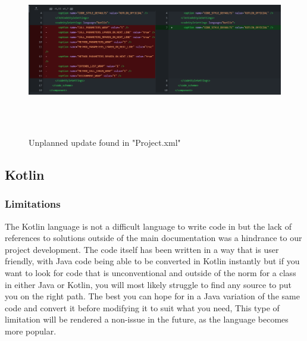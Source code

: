 \begin{figure}[H]
    \centering
    \includegraphics[width=16cm, height = 7.5cm]{img/Unplannedupdate.png}
    \caption{Unplanned update found in "Project.xml"}
    \label{fig:altas config}
\end{figure}

\subsection{Kotlin}
\subsubsection{Limitations}
The Kotlin language is not a difficult language to write code in but the lack of references to solutions outside of the main documentation was a hindrance to our project development. 
\newline
\newline 
The code itself has been written in a way that is user friendly, with Java code being able to be converted in Kotlin instantly but if you want to look for code that is unconventional and outside of the norm for a class in either Java or Kotlin, you will most likely struggle to find any source to put you on the right path. 
\newline
\newline 
The best you can hope for in a Java variation of the same code and \newline convert it before modifying it to suit what you need,
This type of limitation will be rendered a non-issue in the future, as the language becomes more popular. 
\newpage
